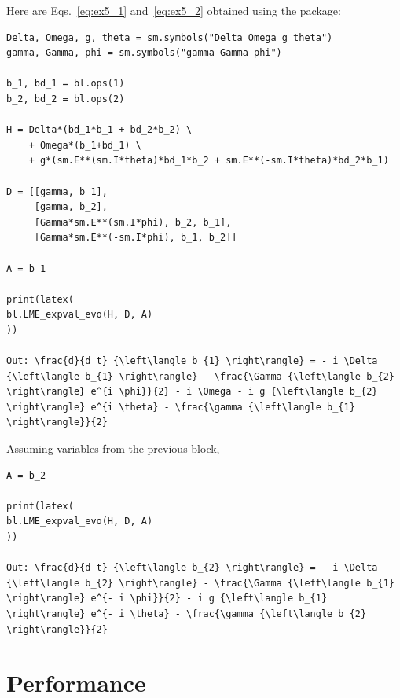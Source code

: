 \documentclass[onecolumn, 12pt, sort&compress]{elsarticle}
\begin{document}
Here are Eqs.~\eqref{eq:ex5_1} and~\eqref{eq:ex5_2} obtained using the package:
\begin{verbatim}
Delta, Omega, g, theta = sm.symbols("Delta Omega g theta")
gamma, Gamma, phi = sm.symbols("gamma Gamma phi")

b_1, bd_1 = bl.ops(1)
b_2, bd_2 = bl.ops(2)

H = Delta*(bd_1*b_1 + bd_2*b_2) \
    + Omega*(b_1+bd_1) \
    + g*(sm.E**(sm.I*theta)*bd_1*b_2 + sm.E**(-sm.I*theta)*bd_2*b_1)

D = [[gamma, b_1],
     [gamma, b_2],
     [Gamma*sm.E**(sm.I*phi), b_2, b_1],
     [Gamma*sm.E**(-sm.I*phi), b_1, b_2]]

A = b_1

print(latex(
bl.LME_expval_evo(H, D, A)
))

Out: \frac{d}{d t} {\left\langle b_{1} \right\rangle} = - i \Delta {\left\langle b_{1} \right\rangle} - \frac{\Gamma {\left\langle b_{2} \right\rangle} e^{i \phi}}{2} - i \Omega - i g {\left\langle b_{2} \right\rangle} e^{i \theta} - \frac{\gamma {\left\langle b_{1} \right\rangle}}{2}
\end{verbatim}
Assuming variables from the previous block,
\begin{verbatim}
A = b_2

print(latex(
bl.LME_expval_evo(H, D, A)
))

Out: \frac{d}{d t} {\left\langle b_{2} \right\rangle} = - i \Delta {\left\langle b_{2} \right\rangle} - \frac{\Gamma {\left\langle b_{1} \right\rangle} e^{- i \phi}}{2} - i g {\left\langle b_{1} \right\rangle} e^{- i \theta} - \frac{\gamma {\left\langle b_{2} \right\rangle}}{2}
\end{verbatim}

\section{Performance}\label{section:performance}
\end{document}
